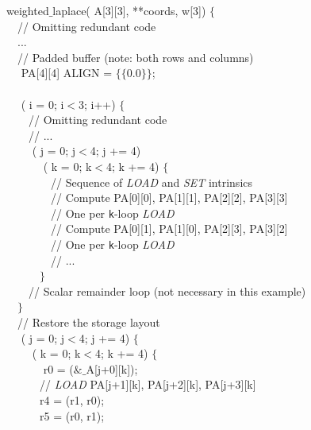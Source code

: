 \begin{algorithm}
\scriptsize\ttfamily
{}

 weighted$\_$laplace( A[3][3],  **coords,  w[3]) $\lbrace$\\
~~// Omitting redundant code \\
~~...\\
~~// Padded buffer (note: both rows and columns) \\
~~ PA[4][4] ALIGN = $\lbrace\lbrace$0.0$\rbrace\rbrace$;\\
~~\\
~~ ( i = 0; i$<$3; i++) $\lbrace$ \\
~~~~// Omitting redundant code \\
~~~~// ... \\
~~~~ ( j = 0; j$<$4; j += 4) \\
~~~~~~ ( k = 0; k$<$4; k += 4) $\lbrace$\\
~~~~~~~~// Sequence of \emph{LOAD} and \emph{SET} intrinsics \\
~~~~~~~~// Compute PA[0][0], PA[1][1], PA[2][2], PA[3][3] \\
~~~~~~~~// One  per \texttt{k}-loop \emph{LOAD}\\
~~~~~~~~// Compute PA[0][1], PA[1][0], PA[2][3], PA[3][2] \\
~~~~~~~~// One  per \texttt{k}-loop \emph{LOAD}\\
~~~~~~~~// ...\\
~~~~~~$\rbrace$\\
~~~~// Scalar remainder loop (not necessary in this example)\\
~~$\rbrace$\\
~~// Restore the storage layout\\
~~ ( j = 0; j$<$4; j += 4) $\lbrace$\\
~~~~ ( k = 0; k$<$4; k += 4) $\lbrace$\\
~~~~~~ r0 =  ($\&\_$A[j+0][k]);\\
~~~~~~// \emph{LOAD} PA[j+1][k], PA[j+2][k], PA[j+3][k]\\
~~~~~~r4 =  (r1, r0);\\
~~~~~~r5 =  (r0, r1);\\

\end{algorithm}
